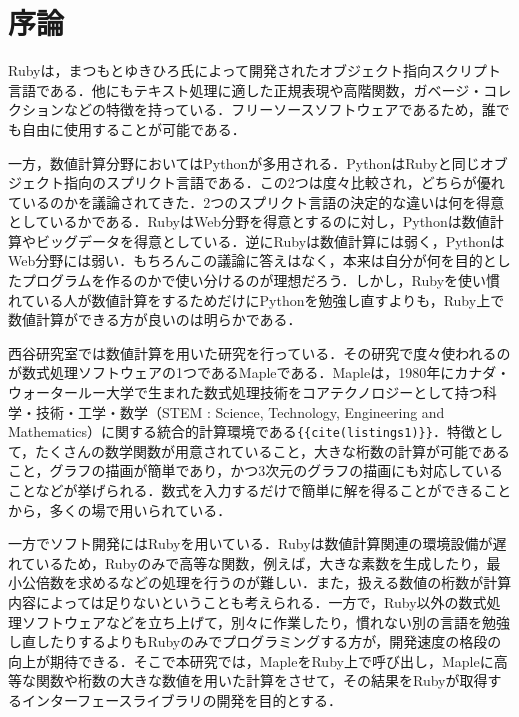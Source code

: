 \section{序論}
Rubyは，まつもとゆきひろ氏によって開発されたオブジェクト指向スクリプト言語である．他にもテキスト処理に適した正規表現や高階関数，ガベージ・コレクションなどの特徴を持っている．フリーソースソフトウェアであるため，誰でも自由に使用することが可能である．

一方，数値計算分野においてはPythonが多用される．PythonはRubyと同じオブジェクト指向のスプリクト言語である．この2つは度々比較され，どちらが優れているのかを議論されてきた．2つのスプリクト言語の決定的な違いは何を得意としているかである．RubyはWeb分野を得意とするのに対し，Pythonは数値計算やビッグデータを得意としている．逆にRubyは数値計算には弱く，PythonはWeb分野には弱い．もちろんこの議論に答えはなく，本来は自分が何を目的としたプログラムを作るのかで使い分けるのが理想だろう．しかし，Rubyを使い慣れている人が数値計算をするためだけにPythonを勉強し直すよりも，Ruby上で数値計算ができる方が良いのは明らかである．

西谷研究室では数値計算を用いた研究を行っている．その研究で度々使われるのが数式処理ソフトウェアの1つであるMapleである．Mapleは，1980年にカナダ・ウォータールー大学で生まれた数式処理技術をコアテクノロジーとして持つ科学・技術・工学・数学（STEM : Science, Technology, Engineering and Mathematics）に関する統合的計算環境である\verb|{{cite(listings1)}}|．特徴として，たくさんの数学関数が用意されていること，大きな桁数の計算が可能であること，グラフの描画が簡単であり，かつ3次元のグラフの描画にも対応していることなどが挙げられる．数式を入力するだけで簡単に解を得ることができることから，多くの場で用いられている．

一方でソフト開発にはRubyを用いている．Rubyは数値計算関連の環境設備が遅れているため，Rubyのみで高等な関数，例えば，大きな素数を生成したり，最小公倍数を求めるなどの処理を行うのが難しい．また，扱える数値の桁数が計算内容によっては足りないということも考えられる．一方で，Ruby以外の数式処理ソフトウェアなどを立ち上げて，別々に作業したり，慣れない別の言語を勉強し直したりするよりもRubyのみでプログラミングする方が，開発速度の格段の向上が期待できる．そこで本研究では，MapleをRuby上で呼び出し，Mapleに高等な関数や桁数の大きな数値を用いた計算をさせて，その結果をRubyが取得するインターフェースライブラリの開発を目的とする．

